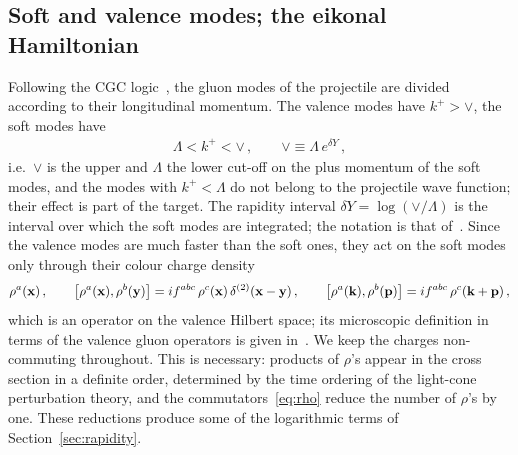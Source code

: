 \subsection{Soft and valence modes; the eikonal Hamiltonian}\label{sec:hamiltonian}

Following the CGC logic~\cite{McLerran:1993ni,McLerran:1993ka,Jalilian-Marian:1997jx,Kovner:2005en}, the gluon modes of the projectile are divided according to their longitudinal momentum. The valence modes have $k^+>\vee$, the soft modes have
\begin{align}
\Lambda<k^+<\vee\,,\qquad \vee\equiv\Lambda\,e^{\delta Y}\,,
\end{align}
i.e.\ $\vee$ is the upper and $\Lambda$ the lower cut-off on the plus momentum of the soft modes, and the modes with $k^+<\Lambda$ do not belong to the projectile wave function; their effect is part of the target. The rapidity interval $\delta Y=\log(\vee/\Lambda)$ is the interval over which the soft modes are integrated; the notation is that of~\cite{Lublinsky:2016meo,Radhakrishnan:2026soft}. Since the valence modes are much faster than the soft ones, they act on the soft modes only through their colour charge density
\begin{align}\label{eq:rho}
\rho^a(\mathbf{x})\,,\qquad \big[\rho^a(\mathbf{x}),\rho^b(\mathbf{y})\big]=i f^{abc}\,\rho^c(\mathbf{x})\,\delta^{(2)}(\mathbf{x}-\mathbf{y})\,,\qquad
\big[\rho^a(\mathbf{k}),\rho^b(\mathbf{p})\big]=i f^{abc}\,\rho^c(\mathbf{k}+\mathbf{p})\,,
\end{align}
which is an operator on the valence Hilbert space; its microscopic definition in terms of the valence gluon operators is given in~\cite{Radhakrishnan:2026soft}. We keep the charges non-commuting throughout. This is necessary: products of $\rho$'s appear in the cross section in a definite order, determined by the time ordering of the light-cone perturbation theory, and the commutators~\eqref{eq:rho} reduce the number of $\rho$'s by one. These reductions produce some of the logarithmic terms of Section~\ref{sec:rapidity}.

